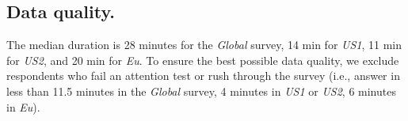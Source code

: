 \documentclass{nature}
\begin{document}
\begin{methods}
\subsection{\small Data quality.} %
The median duration is 28 minutes for the \textit{Global} survey, 14 min for \textit{US1}, 11 min for \textit{US2}, and 20 min for \textit{Eu}. To ensure the best possible data quality, we exclude respondents who fail an attention test or rush through the survey (i.e., answer in less than 11.5 minutes in the \textit{Global} survey, 4 minutes in \textit{US1} or \textit{US2}, 6 minutes in \textit{Eu}). %




\end{methods}
\end{document}
